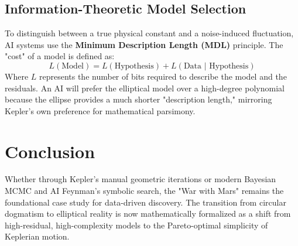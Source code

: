 \documentclass[11pt]{article}
\begin{document}
\subsection{Information-Theoretic Model Selection}
To distinguish between a true physical constant and a noise-induced fluctuation, AI systems use the \textbf{Minimum Description Length (MDL)} principle. The "cost" of a model is defined as:
\begin{equation}
L(\text{Model}) = L(\text{Hypothesis}) + L(\text{Data | Hypothesis})
\end{equation}
Where $L$ represents the number of bits required to describe the model and the residuals. An AI will prefer the elliptical model over a high-degree polynomial because the ellipse provides a much shorter "description length," mirroring Kepler's own preference for mathematical parsimony.

\section{Conclusion}
Whether through Kepler's manual geometric iterations or modern Bayesian MCMC and AI Feynman's symbolic search, the "War with Mars" remains the foundational case study for data-driven discovery. The transition from circular dogmatism to elliptical reality is now mathematically formalized as a shift from high-residual, high-complexity models to the Pareto-optimal simplicity of Keplerian motion.
\end{document}
